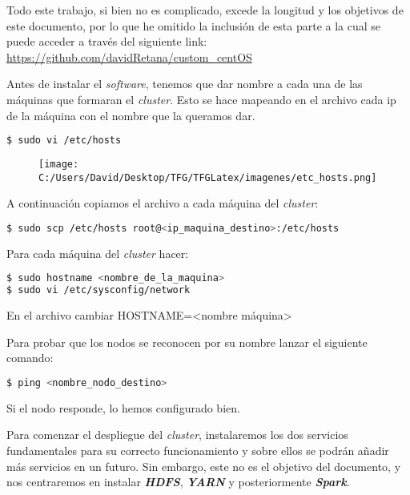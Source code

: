 \clearpage

Todo este trabajo, si bien no es complicado, excede la longitud y los objetivos de este documento, por lo que he
omitido la inclusión de esta parte a la cual se puede acceder a través del siguiente link: 
\url{https://github.com/davidRetana/custom_centOS}
\newline

Antes de instalar el \textit{software}, tenemos que dar nombre a cada una de las máquinas que formaran el \textit{cluster}.
Esto se hace mapeando en el archivo  cada ip de la máquina con el nombre que la queramos dar.

\begin{lstlisting}[language=bash, numbers=none]
$ sudo vi /etc/hosts
\end{lstlisting}

\begin{figure}[!htpb]
  \centering
  \texttt{[image: C:/Users/David/Desktop/TFG/TFGLatex/imagenes/etc\_hosts.png]}
  \label{etc_hosts}
\end{figure}

A continuación copiamos el archivo a cada máquina del \textit{cluster}:
\begin{lstlisting}[language=bash, numbers=none]
$ sudo scp /etc/hosts root@<ip_maquina_destino>:/etc/hosts
\end{lstlisting}

Para cada máquina del \textit{cluster} hacer:
\begin{lstlisting}[language=bash, numbers=none]
$ sudo hostname <nombre_de_la_maquina>
$ sudo vi /etc/sysconfig/network
\end{lstlisting}
En el archivo  cambiar HOSTNAME=<nombre máquina>
\newline

Para probar que los nodos se reconocen por su nombre lanzar el siguiente comando:
\begin{lstlisting}[language=bash, numbers=none]
$ ping <nombre_nodo_destino>
\end{lstlisting}
Si el nodo responde, lo hemos configurado bien.
\newline

Para comenzar el despliegue del \textit{cluster}, instalaremos los dos servicios fundamentales para su 
correcto funcionamiento y sobre ellos se podrán añadir más servicios en un futuro. 
Sin embargo, este no es el objetivo del documento, y nos centraremos en instalar \textbf{\textit{HDFS}}, 
\textbf{\textit{YARN}} y posteriormente \textbf{\textit{Spark}}. 

